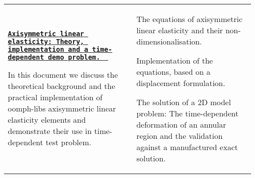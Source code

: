 \begin{longtabu}
{}\\
\href{../../axisym_linear_elasticity/cylinder/html/index.html}{\tt {\bfseries Axisymmetric linear elasticity\+: Theory, implementation and a time-\/dependent demo problem. } }

In this document we discuss the theoretical background and the practical implementation of {\ttfamily oomph-\/lib\textquotesingle{}s} axisymmetric linear elasticity elements and demonstrate their use in time-\/dependent test problem.  &
\begin{DoxyItemize}
\item The equations of axisymmetric linear elasticity and their non-\/dimensionalisation.
\item Implementation of the equations, based on a displacement formulation.
\item The solution of a 2D model problem\+: The time-\/dependent deformation of an annular region and the validation against a manufactured exact solution.
\end{DoxyItemize}



\\
\end{longtabu}
\tabulinesep=1mm
